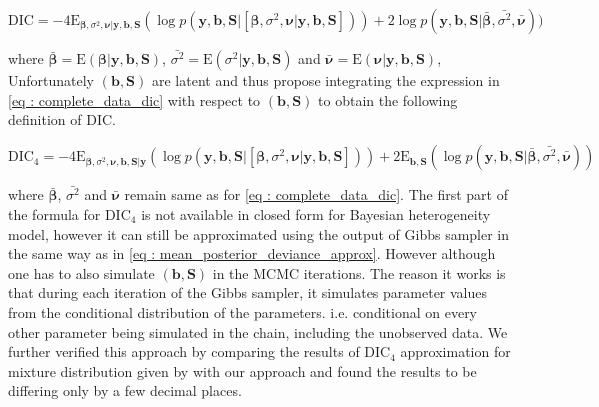 \begin{equation}
\label{eq : complete_data_dic}
\text{DIC} = -4\text{E}_{\boldsymbol{\beta}, \sigma^2, \boldsymbol{\nu}|\boldsymbol{y}, \boldsymbol{b}, \boldsymbol{S}}(\log{p(\boldsymbol{y}, \boldsymbol{b}, \boldsymbol{S}|[\boldsymbol{\beta}, \sigma^2, \boldsymbol{\nu}|\boldsymbol{y}, \boldsymbol{b}, \boldsymbol{S}])}) + 
2\log{p(\boldsymbol{y}, \boldsymbol{b}, \boldsymbol{S}|\boldsymbol{\bar{\beta}}, \bar{\sigma^2}, \boldsymbol{\bar{\nu}})})
\end{equation}

where 
$\boldsymbol{\bar{\beta}}=\text{E}(\boldsymbol{\beta}|\boldsymbol{y}, \boldsymbol{b}, \boldsymbol{S})$, 
$\bar{\sigma^2}=\text{E}(\sigma^2|\boldsymbol{y}, \boldsymbol{b}, \boldsymbol{S})$ and 
$\boldsymbol{\bar{\nu}}=\text{E}(\boldsymbol{\nu}|\boldsymbol{y}, \boldsymbol{b}, \boldsymbol{S})$,\\

Unfortunately $(\boldsymbol{b}, \boldsymbol{S})$ are latent and thus \citet{celeux_deviance_2006} propose integrating the expression in \ref{eq : complete_data_dic} with respect to $(\boldsymbol{b}, \boldsymbol{S})$ to obtain the following definition of DIC.

\begin{equation}
\label{eq : DIC4}
\text{DIC}_4 = -4\text{E}_{\boldsymbol{\beta}, \sigma^2, \boldsymbol{\nu},\boldsymbol{b}, \boldsymbol{S}|\boldsymbol{y}}(\log{p(\boldsymbol{y}, \boldsymbol{b}, \boldsymbol{S}|[\boldsymbol{\beta}, \sigma^2, \boldsymbol{\nu}|\boldsymbol{y}, \boldsymbol{b}, \boldsymbol{S}])}) + 
2\text{E}_{\boldsymbol{b},\boldsymbol{S}}(\log{p(\boldsymbol{y}, \boldsymbol{b}, \boldsymbol{S}|\boldsymbol{\bar{\beta}}, \bar{\sigma^2}, \boldsymbol{\bar{\nu}})})
\end{equation}

where 
$\boldsymbol{\bar{\beta}}$, $\bar{\sigma^2}$ and $\boldsymbol{\bar{\nu}}$ remain same as for \ref{eq : complete_data_dic}. The first part of the formula for $\text{DIC}_4$ is not available in closed form for Bayesian heterogeneity model, however it can still be approximated using the output of Gibbs sampler in the same way as in \ref{eq : mean_posterior_deviance_approx}. However although one has to also simulate $(\boldsymbol{b}, \boldsymbol{S})$ in the MCMC iterations. The reason it works is that during each iteration of the Gibbs sampler, it simulates parameter values from the conditional distribution of the parameters. i.e. conditional on every other parameter being simulated in the chain, including the unobserved data. We further verified this approach by comparing the results of $\text{DIC}_4$ approximation for mixture distribution given by \citet{celeux_deviance_2006} with our approach and found the results to be differing only by a few decimal places.\\

